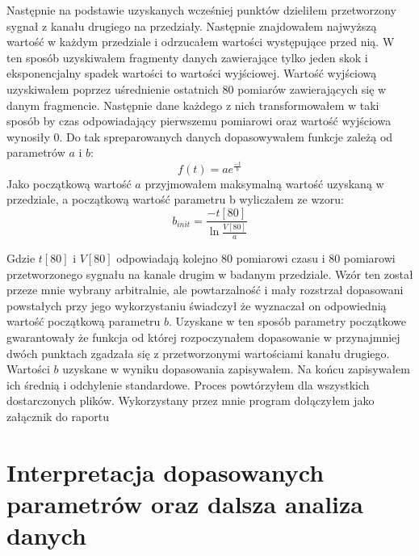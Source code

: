\documentclass[10pt,a4paper]{article}
\begin{document}
Następnie na podstawie uzyskanych wcześniej punktów dzieliłem przetworzony sygnał z kanału drugiego na przedziały. Następnie znajdowałem najwyższą wartość w każdym przedziale i odrzucałem wartości występujące przed nią.  W ten sposób uzyskiwałem fragmenty danych zawierające tylko jeden skok  i eksponencjalny spadek wartości  to wartości wyjściowej. Wartość wyjściową uzyskiwałem poprzez uśrednienie ostatnich 80 pomiarów zawierających się w danym fragmencie.  Następnie dane każdego z nich transformowałem w taki sposób by  czas odpowiadający pierwszemu pomiarowi oraz wartość wyjściowa wynosiły 0. Do tak spreparowanych danych dopasowywałem funkcje zależą od parametrów $a$ i $b$: 
\begin{equation}
    \label{exp}
    f(t) = a e^{\frac{-t}{b}}
\end{equation}
Jako początkową wartość $a$ przyjmowałem maksymalną wartość uzyskaną w przedziale, a początkową wartość parametru b wyliczałem ze wzoru:
\begin{equation}
    \label{binit}
    b_{init} = \frac{-t[80]}{\ln{\frac{V[80]}{a}}}
\end{equation}

Gdzie $t[80]$ i $V[80]$ odpowiadają kolejno 80 pomiarowi czasu i 80 pomiarowi przetworzonego sygnału na kanale drugim w badanym przedziale.  Wzór ten został przeze mnie wybrany arbitralnie, ale powtarzalność i mały rozstrzał dopasowani powstałych przy jego wykorzystaniu świadczył że wyznaczał on odpowiednią wartość początkową parametru $b$. Uzyskane w ten sposób parametry początkowe gwarantowały że funkcja od której rozpoczynałem dopasowanie w przynajmniej dwóch punktach zgadzała się z przetworzonymi wartościami kanału drugiego.
Wartości $b$ uzyskane w wyniku dopasowania zapisywałem. Na końcu zapisywałem ich średnią i odchylenie standardowe. Proces powtórzyłem dla wszystkich dostarczonych plików.
Wykorzystany przez mnie program dołączyłem jako załącznik do raportu

\section{Interpretacja dopasowanych parametrów oraz dalsza analiza danych}
\end{document}
